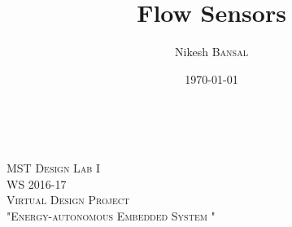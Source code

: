 \documentclass{article}
\title{Flow Sensors} %
\author{Nikesh \textsc{Bansal}} %
\date{\today} %
\begin{document}
	
	\begin{titlepage}
		
		
		\par
		\hfill
		\\[1 cm]%
		\par
		
		
		
		\newcommand{\HRule}{\rule{\linewidth}{0.5mm}} %
		
		\center %
		
		
		\textsc{\LARGE MST Design Lab I \\[0.5mm] WS 2016-17 }\\[1.5cm] %
		\textsc{\Large Virtual Design Project}\\[0.5cm] %
		\textsc{\large "Energy-autonomous Embedded System "}\\[0.5cm] %
		
		

\end{titlepage}
\end{document}

